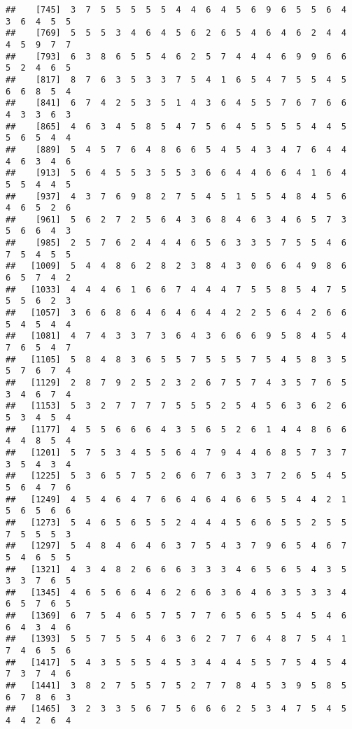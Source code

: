 \documentclass[
]{book}
\begin{document}
\begin{verbatim}
##    [745]  3  7  5  5  5  5  5  4  4  6  4  5  6  9  6  5  5  6  4  3  6  4  5  5
##    [769]  5  5  5  3  4  6  4  5  6  2  6  5  4  6  4  6  2  4  4  4  5  9  7  7
##    [793]  6  3  8  6  5  5  4  6  2  5  7  4  4  4  6  9  9  6  6  5  2  4  6  5
##    [817]  8  7  6  3  5  3  3  7  5  4  1  6  5  4  7  5  5  4  5  6  6  8  5  4
##    [841]  6  7  4  2  5  3  5  1  4  3  6  4  5  5  7  6  7  6  6  4  3  3  6  3
##    [865]  4  6  3  4  5  8  5  4  7  5  6  4  5  5  5  5  4  4  5  5  6  5  4  4
##    [889]  5  4  5  7  6  4  8  6  6  5  4  5  4  3  4  7  6  4  4  4  6  3  4  6
##    [913]  5  6  4  5  5  3  5  5  3  6  6  4  4  6  6  4  1  6  4  5  5  4  4  5
##    [937]  4  3  7  6  9  8  2  7  5  4  5  1  5  5  4  8  4  5  6  4  6  5  2  6
##    [961]  5  6  2  7  2  5  6  4  3  6  8  4  6  3  4  6  5  7  3  5  6  6  4  3
##    [985]  2  5  7  6  2  4  4  4  6  5  6  3  3  5  7  5  5  4  6  7  5  4  5  5
##   [1009]  5  4  4  8  6  2  8  2  3  8  4  3  0  6  6  4  9  8  6  6  5  7  4  2
##   [1033]  4  4  4  6  1  6  6  7  4  4  4  7  5  5  8  5  4  7  5  5  5  6  2  3
##   [1057]  3  6  6  8  6  4  6  4  6  4  4  2  2  5  6  4  2  6  6  5  4  5  4  4
##   [1081]  4  7  4  3  3  7  3  6  4  3  6  6  6  9  5  8  4  5  4  7  6  5  4  7
##   [1105]  5  8  4  8  3  6  5  5  7  5  5  5  7  5  4  5  8  3  5  5  7  6  7  4
##   [1129]  2  8  7  9  2  5  2  3  2  6  7  5  7  4  3  5  7  6  5  3  4  6  7  4
##   [1153]  5  3  2  7  7  7  7  5  5  5  2  5  4  5  6  3  6  2  6  5  3  4  5  4
##   [1177]  4  5  5  6  6  6  4  3  5  6  5  2  6  1  4  4  8  6  6  4  4  8  5  4
##   [1201]  5  7  5  3  4  5  5  6  4  7  9  4  4  6  8  5  7  3  7  3  5  4  3  4
##   [1225]  5  3  6  5  7  5  2  6  6  7  6  3  3  7  2  6  5  4  5  5  6  4  7  6
##   [1249]  4  5  4  6  4  7  6  6  4  6  4  6  6  5  5  4  4  2  1  5  6  5  6  6
##   [1273]  5  4  6  5  6  5  5  2  4  4  4  5  6  6  5  5  2  5  5  7  5  5  5  3
##   [1297]  5  4  8  4  6  4  6  3  7  5  4  3  7  9  6  5  4  6  7  5  4  6  5  5
##   [1321]  4  3  4  8  2  6  6  6  3  3  3  4  6  5  6  5  4  3  5  3  3  7  6  5
##   [1345]  4  6  5  6  6  4  6  2  6  6  3  6  4  6  3  5  3  3  4  6  5  7  6  5
##   [1369]  6  7  5  4  6  5  7  5  7  7  6  5  6  5  5  4  5  4  6  6  4  3  4  6
##   [1393]  5  5  7  5  5  4  6  3  6  2  7  7  6  4  8  7  5  4  1  7  4  6  5  6
##   [1417]  5  4  3  5  5  5  4  5  3  4  4  4  5  5  7  5  4  5  4  7  3  7  4  6
##   [1441]  3  8  2  7  5  5  7  5  2  7  7  8  4  5  3  9  5  8  5  6  7  8  6  3
##   [1465]  3  2  3  3  5  6  7  5  6  6  6  2  5  3  4  7  5  4  5  4  4  2  6  4

\end{verbatim}
\end{document}
